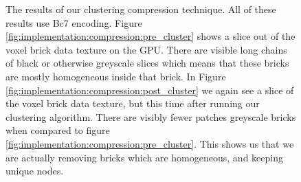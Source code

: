 \begin{figure}[H]
    \centering
    \hfill
    \caption{The results of our clustering compression technique. All of these results use Bc7 encoding. Figure \ref{fig:implementation:compression:pre_cluster} shows a slice out of the voxel brick data texture on the GPU. There are visible long chains of black or otherwise greyscale slices which means that these bricks are mostly homogeneous inside that brick. In Figure \ref{fig:implementation:compression:post_cluster} we again see a slice of the voxel brick data texture, but this time after running our clustering algorithm. There are visibly fewer patches greyscale bricks when compared to figure \ref{fig:implementation:compression:pre_cluster}. This shows us that we are actually removing bricks which are homogeneous, and keeping unique nodes.} \label{fig:implementation:compression:cluster}
\end{figure}